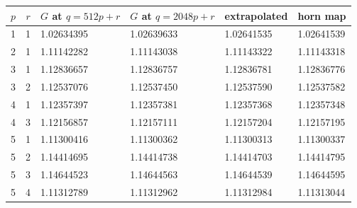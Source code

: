 \begin{tabular}{@{}ccllll@{}}
\toprule
$p$ & $r$ & $G$ at $q=512p+r$ & $G$ at $q=2048p+r$ & extrapolated & horn map \\
\midrule
1 & 1 & 1.02634395 & 1.02639633 & 1.02641535 & 1.02641539 \\
2 & 1 & 1.11142282 & 1.11143038 & 1.11143322 & 1.11143318 \\
3 & 1 & 1.12836657 & 1.12836757 & 1.12836781 & 1.12836776 \\
3 & 2 & 1.12537076 & 1.12537450 & 1.12537590 & 1.12537582 \\
4 & 1 & 1.12357397 & 1.12357381 & 1.12357368 & 1.12357348 \\
4 & 3 & 1.12156857 & 1.12157111 & 1.12157204 & 1.12157195 \\
5 & 1 & 1.11300416 & 1.11300362 & 1.11300313 & 1.11300337 \\
5 & 2 & 1.14414695 & 1.14414738 & 1.14414703 & 1.14414795 \\
5 & 3 & 1.14644523 & 1.14644563 & 1.14644539 & 1.14644595 \\
5 & 4 & 1.11312789 & 1.11312962 & 1.11312984 & 1.11313044 \\
\bottomrule
\end{tabular}
